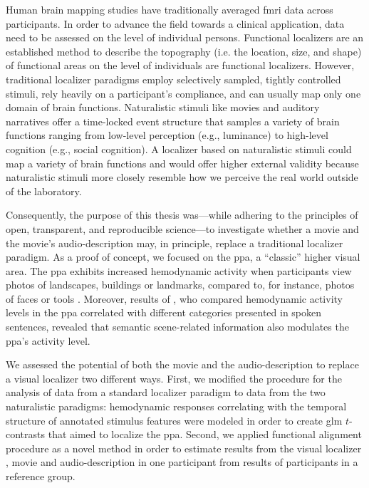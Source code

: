 

Human brain mapping studies have traditionally averaged \ac{fmri} data across
participants.
%
In order to advance the field towards a clinical application, data need to be
assessed on the level of individual persons.
Functional localizers are an established method to describe the topography (i.e.
the location, size, and shape) of functional areas on the level of individuals
are functional localizers.
However, traditional localizer paradigms employ selectively sampled, tightly
controlled stimuli, rely heavily on a participant's compliance, and can usually
map only one domain of brain functions.
Naturalistic stimuli like movies and auditory narratives \citep[cf.][for
reviews]{jaaskelainen2021movies, jaaskelainen2020neural} offer a time-locked
event structure that samples a variety of brain functions ranging from low-level
perception (e.g., luminance) to high-level cognition (e.g., social cognition).
%
A localizer based on naturalistic stimuli could map a variety of brain functions
and would offer higher external validity because naturalistic stimuli more
closely resemble how we perceive the real world outside of the laboratory.

Consequently, the purpose of this thesis was---while adhering to the principles
of open, transparent, and reproducible science---to investigate whether a movie
and the movie's audio-description may, in principle, replace a traditional
localizer paradigm.
As a proof of concept, we focused on the \ac{ppa}, a ``classic'' higher visual
area.
%
The \ac{ppa} exhibits increased hemodynamic activity when participants view
photos of landscapes, buildings or landmarks, compared to, for instance, photos
of faces or tools \citep[e.g.,][for reviews]{epstein2014neural,
aminoff2013role}.
%
Moreover, results of \citet{aziz2008modulation}, who compared hemodynamic
activity levels in the \ac{ppa} correlated with different categories presented
in spoken sentences, revealed that semantic scene-related information also
modulates the \ac{ppa}'s activity level.

%
We assessed the potential of both the movie and the audio-description to replace
a visual localizer two different ways.
First, we modified the procedure for the analysis of data from a standard
localizer paradigm to data from the two naturalistic paradigms:
%
hemodynamic responses correlating with the temporal structure of annotated
stimulus features \citep[cf.][]{haeusler2016cutanno, haeusler2021speechanno}
were modeled in order to create \ac{glm} $t$-contrasts that aimed to localize
the \ac{ppa}.
Second, we applied functional alignment procedure as a novel method in order to
estimate results from the visual localizer \citep[cf.][]{sengupta2016extension},
movie and audio-description \citep[cf.][]{haeusler2022processing} in one
participant from results of participants in a reference group.



